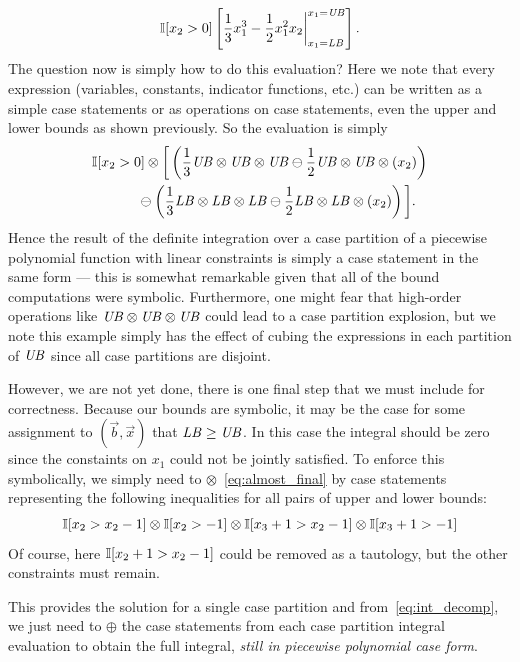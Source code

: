\documentclass[letterpaper]{article}
\renewcommand{\-}{\text{-}}
\begin{document}
{{\footnotesize
\begin{equation}
\mathbb{I}[x_2 > 0] \left[ \frac{1}{3}x_1^3 - \frac{1}{2}x_1^2 x_2 \bigg|_{x_1=\mathit{LB}}^{x_1=\mathit{UB}} \right] .
\end{equation} }
The question now is simply how to do this evaluation?  Here we note
that every expression (variables, constants, indicator functions, etc.) 
can be written as a 
simple case statements or as operations on case statements, even the upper
and lower bounds as shown previously.  So the evaluation is simply 
\vspace{-1mm}
{\footnotesize
\begin{align}
\I[x_2 > 0] \otimes \bigg[ & \left( \frac{1}{3} \UB \otimes \UB \otimes \UB \ominus \frac{1}{2} \UB \otimes \UB \otimes (x_2) \right) \nonumber \\
& \hspace{-8mm} \ominus \left( \frac{1}{3} \LB \otimes \LB \otimes \LB \ominus \frac{1}{2} \LB \otimes \LB \otimes (x_2) \right) \bigg] \label{eq:almost_final}.
\end{align}
}
Hence the result of the definite integration over a case
partition of a piecewise polynomial function with linear constraints
is simply a case statement in the same form --- 
this is somewhat remarkable given that
all of the bound computations were symbolic.  Furthermore, one might
fear that high-order operations like $\mathit{UB} \otimes \mathit{UB} \otimes \mathit{UB}$
could lead to a case partition explosion, but we note this example simply
has the effect of cubing the expressions in each partition of $\mathit{UB}$ since
all case partitions are disjoint.

However, we are not yet done, there is one final step that we must
include for correctness.  Because our bounds are symbolic, it may be
the case for some assignment to $(\vec{b},\vec{x})$ that $\mathit{LB} \geq
\mathit{UB}$.  In this case the integral should be zero since the constaints
on $x_1$ could not be jointly satisfied.  To enforce this
symbolically, we simply need to $\otimes$~\eqref{eq:almost_final} by
case statements representing the following inequalities for all pairs
of upper and lower bounds:
{\footnotesize
\begin{equation}
\mathbb{I}[x_2 > x_2 - 1] \otimes \mathbb{I}[x_2 > -1] \otimes \mathbb{I}[x_3 + 1 > x_2 - 1] \otimes \mathbb{I}[x_3 + 1 > -1]
\end{equation}}
Of course, here $\mathbb{I}[x_2 + 1 > x_2 - 1]$ could be removed as a tautology,
but the other constraints must remain.

This provides the solution for a single case partition and 
from~\eqref{eq:int_decomp}, we just need to $\oplus$ the case
statements from each case partition integral evaluation to obtain
the full integral, \emph{still in piecewise polynomial case form}.

}
\end{document}
